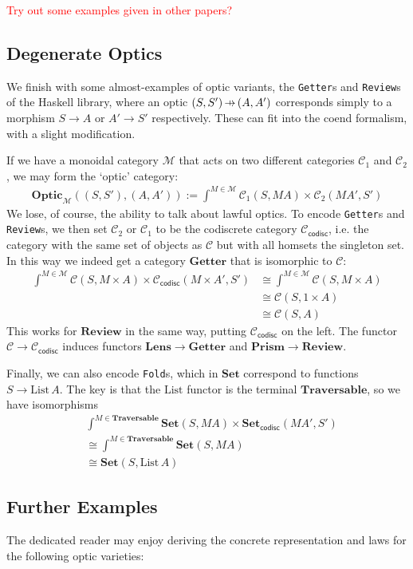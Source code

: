\documentclass[11pt,letterpaper]{article}
\theoremstyle{plain}
\theoremstyle{definition}
\newcommand{\C}{\mathscr{C}}
\newcommand{\M}{\mathscr{M}}
\newcommand{\Set}{\mathbf{Set}}
\newcommand{\Traversable}{\mathbf{Traversable}}
\newcommand{\Optic}{\mathbf{Optic}}
\newcommand{\Lens}{\mathbf{Lens}}
\newcommand{\Prism}{\mathbf{Prism}}
\newcommand{\Getter}{\mathbf{Getter}}
\newcommand{\Review}{\mathbf{Review}}
\newcommand{\hto}{\ensuremath{\,\mathaccent\shortmid\rightarrow\,}}
\newcommand{\todo}[1]{\textcolor{red}{\small #1}}
\begin{document}
\todo{Try out some examples given in other papers?}

\subsection{Degenerate Optics}

We finish with some almost-examples of optic variants, the \texttt{Getter}s and \texttt{Review}s of the Haskell library, where an optic $(S, S') \hto (A, A')$ corresponds simply to a morphism $S \to A$ or $A' \to S'$ respectively. These can fit into the coend formalism, with a slight modification.

If we have a monoidal category $\M$ that acts on two different categories $\C_1$ and $\C_2$, we may form the `optic' category:
\begin{align*}
  \Optic_\M((S, S'), (A, A')) := \int^{M \in \M} \C_1(S, MA) \times \C_2(MA', S')
\end{align*}
We lose, of course, the ability to talk about lawful optics. To encode \texttt{Getter}s and \texttt{Review}s, we then set $\C_2$ or $\C_1$ to be the codiscrete category $\C_\mathsf{codisc}$, i.e. the category with the same set of objects as $\C$ but with all homsets the singleton set. In this way we indeed get a category $\Getter$ that is isomorphic to $\C$:
\begin{align*}
\int^{M \in \M} \C(S, M \times A) \times \C_\mathsf{codisc}(M \times A', S')
&\cong \int^{M \in \M} \C(S, M \times A) \\
&\cong \C(S, 1 \times A) \\
&\cong \C(S, A)
\end{align*}
This works for $\Review$ in the same way, putting $\C_\mathsf{codisc}$ on the left. The functor $\C \to \C_\mathsf{codisc}$ induces functors $\Lens \to \Getter$ and $\Prism \to \Review$.

Finally, we can also encode \texttt{Fold}s, which in $\Set$ correspond to functions $S \to \mathrm{List}\,A$. The key is that the $\mathrm{List}$ functor is the terminal $\Traversable$, so we have isomorphisms
\begin{align*}
&\int^{M \in \Traversable} \Set(S, MA) \times \Set_\mathsf{codisc}(MA', S') \\
&\cong \int^{M \in \Traversable} \Set(S, MA) \\
&\cong \Set(S, \mathrm{List}\,A)
\end{align*}

\subsection{Further Examples}
The dedicated reader may enjoy deriving the concrete representation and laws for the following optic varieties:
\end{document}
